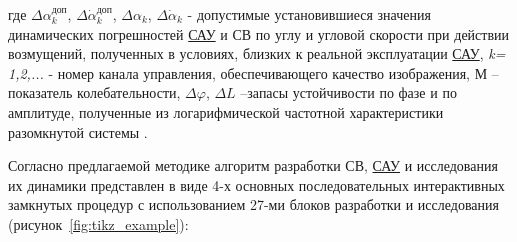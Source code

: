 где $\varDelta \alpha^{\textit{доп}}_{k}$, 
$\varDelta \dot{\alpha}^{\textit{доп}}_{k}$, 
$\varDelta \alpha _k$, 
$\varDelta \dot{\alpha}_k$ 
- допустимые установившиеся значения динамических погрешностей \hyperref[acroSAU]{САУ} и СВ по углу и угловой скорости при действии возмущений, полученных в условиях, близких к реальной эксплуатации \hyperref[acroSAU]{САУ}, \textit{k= 1,2,...} - номер канала управления, обеспечивающего качество изображения, М – показатель колебательности, $\varDelta \varphi$, $\varDelta L$ –запасы устойчивости по фазе и по амплитуде, полученные из логарифмической частотной характеристики разомкнутой системы \cite[]{Bessekerski20}.

Согласно предлагаемой методике алгоритм разработки СВ, \hyperref[acroSAU]{САУ} и исследования их динамики представлен в виде 4-х основных последовательных интерактивных замкнутых процедур с использованием 27-ми блоков разработки и исследования (рисунок~\ref{fig:tikz_example}):

